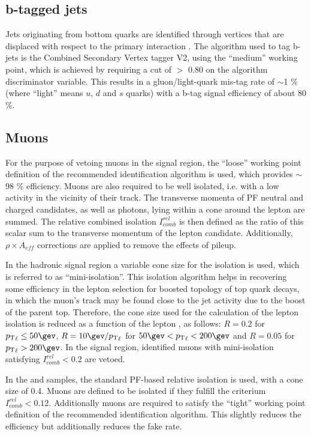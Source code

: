 \subsection{b-tagged jets}
\label{sec:btags}
Jets originating from bottom quarks are identified through vertices that are displaced with respect to the primary interaction \cite{Chatrchyan:2012jua}. The algorithm used to tag b-jets is the Combined Secondary Vertex tagger V2, using the ``medium'' working point, which is achieved by requiring a cut of $>$ 0.80 on the algorithm discriminator variable. 
This results in a gluon/light-quark mis-tag rate of $\sim$1 \% (where ``light'' means $u$, $d$ and $s$ quarks) with a b-tag signal efficiency of about 80 \%. 


\subsection{Muons}
\label{sec:muon-id}
For the purpose of vetoing muons in the signal region, the ``loose'' working point 
definition of the recommended identification algorithm is used, which provides $\sim$ 98 $\%$ efficiency. 
Muons are also required to be well isolated, i.e. with a low activity in the vicinity of their track. 
The transverse momenta of PF neutral and charged candidates, as well as photons, lying within a cone around the lepton are summed. 
The relative combined isolation $I^{rel}_{comb}$ is then defined as 
the ratio of this scalar sum to the transverse momentum of the lepton
candidate. Additionally, $\rho\times A_{eff}$ corrections are applied to
remove the effects of pileup.

In the hadronic signal region a variable cone size for the isolation is used, which is referred to as ``mini-isolation''. 
This isolation algorithm helps in recovering some efficiency in the lepton selection for boosted topology of top quark decays, 
in which the muon's track may be found close to the jet activity due to the boost of the parent top. 
Therefore, the cone size used for the calculation of the lepton isolation is reduced as a function of 
the lepton \Pt, as follows: $R=0.2$ for $\Pt_{\ell}\leq50\gev$,
$R=10\gev/\Pt_{\ell}$ for $50 \gev < \Pt_{\ell} < 200\gev$ and $R=0.05$ for $\Pt_{\ell} > 200 \gev$.
In the signal region, identified muons with mini-isolation satisfying $I^{rel}_{comb} < 0.2$ are vetoed.

In the \mj and \mmj samples, the standard PF-based relative isolation is used, with a cone size of 0.4. 
Muons are defined to be isolated if they fulfill the criterium $I^{rel}_{comb} < 0.12$. 
Additionally muons are required to satisfy the ``tight'' working
point definition of the recommended identification algorithm. This
slightly reduces the efficiency but additionally reduces the fake
rate.

